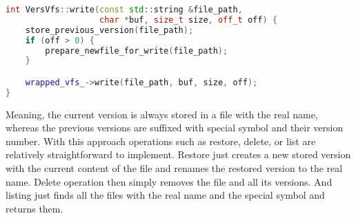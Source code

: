 \begin{lstlisting}[language=c++, basicstyle=\ttfamily\small]
int VersVfs::write(const std::string &file_path,
                   char *buf, size_t size, off_t off) {
    store_previous_version(file_path);
    if (off > 0) {
        prepare_newfile_for_write(file_path);
    }

    wrapped_vfs_->write(file_path, buf, size, off);
}
\end{lstlisting}

Meaning, the current version is always stored in a file with the real name, whereas the previous versions are suffixed with special symbol and their version number.
With this approach operations such as restore, delete, or list are relatively straightforward to implement.
Restore just creates a new stored version with the current content of the file and renames the restored version to the real name.
Delete operation then simply removes the file and all its versions.
And listing just finds all the files with the real name and the special symbol and returns them.